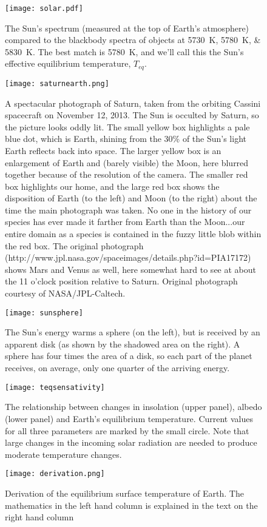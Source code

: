 \begin{figure}[p]
\centering
\texttt{[image: solar.pdf]}%
\caption{The Sun's spectrum (measured at the top of Earth's atmosphere) compared to the blackbody spectra of objects at \SIlist{5730;5780;5830}{\kelvin}. The best match is \SI{5780}{\kelvin}, and we'll call this the Sun's effective equilibrium temperature, $T_{eq}$. }
\label{fig:solar}
\end{figure}

\begin{figure}[p]
\centering
\texttt{[image: saturnearth.png]}%
\caption{A spectacular photograph of Saturn, taken from the orbiting Cassini spacecraft on November 12, 2013. The Sun is occulted by Saturn, so the picture looks oddly lit. The small yellow box highlights a pale blue dot, which is Earth, shining from the 30\% of the Sun's light Earth reflects back into space. The larger yellow box is an enlargement of Earth and (barely visible) the Moon, here blurred together because of the resolution of the camera. The smaller red box highlights our home, and the large red box shows the disposition of Earth (to the left) and Moon (to the right) about the time the main photograph was taken. No one in the history of our species has ever made it farther from Earth than the Moon...our entire domain as a species is contained in the fuzzy little blob within the red box. The original photograph (http://www.jpl.nasa.gov/spaceimages/details.php?id=PIA17172) shows Mars and Venus as well, here somewhat hard to see at about the 11 o'clock position relative to Saturn. Original photograph courtesy of NASA/JPL-Caltech.}
\label{fig:saturnearth}
\end{figure}

\begin{figure}[p]
\centering
\texttt{[image: sunsphere]}%
\caption{The Sun's energy warms a sphere (on the left), but is received by an apparent disk (as shown by the shadowed area on the right). A sphere has four times the area of a disk, so each part of the planet receives, on average, only one quarter of the arriving energy.}
\label{fig:sunsphere}
\end{figure}

\begin{figure}[p]
\centering
\texttt{[image: teqsensativity]}%
\caption{The relationship between changes in insolation (upper panel), albedo (lower panel) and Earth's equilibrium temperature. Current values for all three parameters are marked by the small circle. Note that large changes in the incoming solar radiation are needed to produce moderate temperature changes.}
\label{fig:teqsensativity}
\end{figure}


\begin{figure}[p]
\centering
\texttt{[image: derivation.png]}%
\caption{Derivation of the equilibrium surface temperature of Earth. The mathematics in the left hand column is explained in the text on the right hand column}
\label{fig:teqderivation}
\end{figure}

